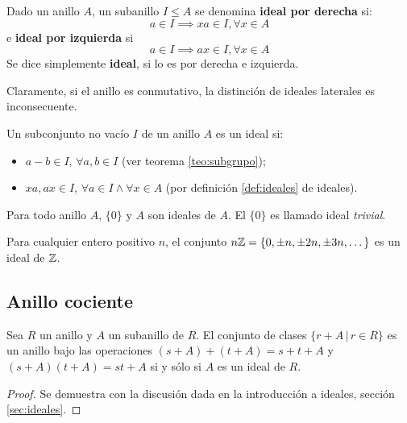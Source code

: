 \begin{fmd-definition}[Ideales] \label{def:ideales}
	Dado un anillo $A$, un subanillo $I \le A$ se denomina \textbf{ideal por derecha} si:
	\[ a \in I \implies xa \in I, \forall x \in A \]
	e \textbf{ideal por izquierda} si
	\[ a \in I \implies ax \in I, \forall x \in A \]
	Se dice simplemente \textbf{ideal}, si lo es por derecha e izquierda.
\end{fmd-definition}

Claramente, si el anillo es conmutativo, la distinción de ideales laterales es inconsecuente.

\begin{fmd-theorem}
	Un subconjunto no vacío $I$ de un anillo $A$ es un ideal si:
	\begin{itemize}
		\item $a - b \in I,\, \forall a, b \in I$ (ver teorema \ref{teo:subgrupo});
		\item $xa, ax \in I$, $\forall a \in I \land \forall x \in A$ (por definición \ref{def:ideales} de ideales).
	\end{itemize}
\end{fmd-theorem}

\begin{example}
	Para todo anillo $A$, $\{0\}$ y $A$ son ideales de $A$. El $\{0\}$ es llamado ideal \textit{trivial}.
\end{example}

\begin{example} \label{ex:ideal}
	Para cualquier entero positivo $n$, el conjunto $n\mathbb{Z} = \{0, \pm n, \pm 2n, \pm 3n, \dots\}$ es un ideal de $\mathbb{Z}$.
\end{example}

\subsection{Anillo cociente}
\vspace{3mm}
\begin{fmd-theorem}
	Sea $R$ un anillo y $A$ un subanillo de $R$. El conjunto de clases $\{ r + A \, | \, r \in R \}$ es un anillo bajo las operaciones $(s + A) + (t + A) = s + t + A$ y $(s + A)(t + A) = st + A$ si y sólo si $A$ es un ideal de $R$.
\end{fmd-theorem}

\begin{proof}
	Se demuestra con la discusión dada en la introducción a ideales, sección \ref{sec:ideales}.
\end{proof}


